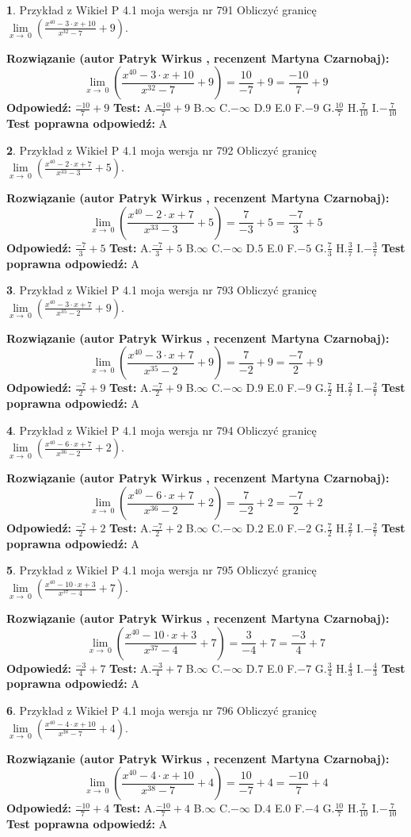 \documentclass[12pt, a4paper]{article}
\theoremstyle{definition} %
\newtheorem{zad}{}
\newcommand{\zadStart}[1]{\begin{zad}#1\newline}
\newcommand{\zadStop}{\end{zad}}
\newcommand{\rozwStart}[2]{\noindent \textbf{Rozwiązanie (autor #1 , recenzent #2): }\newline}
\newcommand{\rozwStop}{\newline}
\newcommand{\odpStart}{\noindent \textbf{Odpowiedź:}\newline}
\newcommand{\odpStop}{\newline}
\newcommand{\testStart}{\noindent \textbf{Test:}\newline}
\newcommand{\testStop}{\newline}
\newcommand{\kluczStart}{\noindent \textbf{Test poprawna odpowiedź:}\newline}
\newcommand{\kluczStop}{\newline}
\begin{document}
\zadStart{Przykład z Wikieł P 4.1 moja wersja nr 791}
Obliczyć granicę $\lim\limits_{x\to\ 0}(\frac{x^{40}-3 \cdot x +10}{x^{32}-7}+9)$.
\zadStop
\rozwStart{Patryk Wirkus}{Martyna Czarnobaj}
$$\lim\limits_{x\to\ 0}(\frac{x^{40}-3 \cdot x +10}{x^{32}-7}+9)=\frac{10}{-7}+9=\frac{-10}{7}+9$$
\rozwStop
\odpStart
$\frac{-10}{7}+9$
\odpStop
\testStart
A.$\frac{-10}{7}+9$
B.$\infty$
C.$-\infty$
D.$9$
E.$0$
F.$-9$
G.$\frac{10}{7}$
H.$\frac{7}{10}$
I.$-\frac{7}{10}$
\testStop
\kluczStart
A
\kluczStop



\zadStart{Przykład z Wikieł P 4.1 moja wersja nr 792}
Obliczyć granicę $\lim\limits_{x\to\ 0}(\frac{x^{40}-2 \cdot x +7}{x^{33}-3}+5)$.
\zadStop
\rozwStart{Patryk Wirkus}{Martyna Czarnobaj}
$$\lim\limits_{x\to\ 0}(\frac{x^{40}-2 \cdot x +7}{x^{33}-3}+5)=\frac{7}{-3}+5=\frac{-7}{3}+5$$
\rozwStop
\odpStart
$\frac{-7}{3}+5$
\odpStop
\testStart
A.$\frac{-7}{3}+5$
B.$\infty$
C.$-\infty$
D.$5$
E.$0$
F.$-5$
G.$\frac{7}{3}$
H.$\frac{3}{7}$
I.$-\frac{3}{7}$
\testStop
\kluczStart
A
\kluczStop



\zadStart{Przykład z Wikieł P 4.1 moja wersja nr 793}
Obliczyć granicę $\lim\limits_{x\to\ 0}(\frac{x^{40}-3 \cdot x +7}{x^{35}-2}+9)$.
\zadStop
\rozwStart{Patryk Wirkus}{Martyna Czarnobaj}
$$\lim\limits_{x\to\ 0}(\frac{x^{40}-3 \cdot x +7}{x^{35}-2}+9)=\frac{7}{-2}+9=\frac{-7}{2}+9$$
\rozwStop
\odpStart
$\frac{-7}{2}+9$
\odpStop
\testStart
A.$\frac{-7}{2}+9$
B.$\infty$
C.$-\infty$
D.$9$
E.$0$
F.$-9$
G.$\frac{7}{2}$
H.$\frac{2}{7}$
I.$-\frac{2}{7}$
\testStop
\kluczStart
A
\kluczStop



\zadStart{Przykład z Wikieł P 4.1 moja wersja nr 794}
Obliczyć granicę $\lim\limits_{x\to\ 0}(\frac{x^{40}-6 \cdot x +7}{x^{36}-2}+2)$.
\zadStop
\rozwStart{Patryk Wirkus}{Martyna Czarnobaj}
$$\lim\limits_{x\to\ 0}(\frac{x^{40}-6 \cdot x +7}{x^{36}-2}+2)=\frac{7}{-2}+2=\frac{-7}{2}+2$$
\rozwStop
\odpStart
$\frac{-7}{2}+2$
\odpStop
\testStart
A.$\frac{-7}{2}+2$
B.$\infty$
C.$-\infty$
D.$2$
E.$0$
F.$-2$
G.$\frac{7}{2}$
H.$\frac{2}{7}$
I.$-\frac{2}{7}$
\testStop
\kluczStart
A
\kluczStop



\zadStart{Przykład z Wikieł P 4.1 moja wersja nr 795}
Obliczyć granicę $\lim\limits_{x\to\ 0}(\frac{x^{40}-10 \cdot x +3}{x^{37}-4}+7)$.
\zadStop
\rozwStart{Patryk Wirkus}{Martyna Czarnobaj}
$$\lim\limits_{x\to\ 0}(\frac{x^{40}-10 \cdot x +3}{x^{37}-4}+7)=\frac{3}{-4}+7=\frac{-3}{4}+7$$
\rozwStop
\odpStart
$\frac{-3}{4}+7$
\odpStop
\testStart
A.$\frac{-3}{4}+7$
B.$\infty$
C.$-\infty$
D.$7$
E.$0$
F.$-7$
G.$\frac{3}{4}$
H.$\frac{4}{3}$
I.$-\frac{4}{3}$
\testStop
\kluczStart
A
\kluczStop



\zadStart{Przykład z Wikieł P 4.1 moja wersja nr 796}
Obliczyć granicę $\lim\limits_{x\to\ 0}(\frac{x^{40}-4 \cdot x +10}{x^{38}-7}+4)$.
\zadStop
\rozwStart{Patryk Wirkus}{Martyna Czarnobaj}
$$\lim\limits_{x\to\ 0}(\frac{x^{40}-4 \cdot x +10}{x^{38}-7}+4)=\frac{10}{-7}+4=\frac{-10}{7}+4$$
\rozwStop
\odpStart
$\frac{-10}{7}+4$
\odpStop
\testStart
A.$\frac{-10}{7}+4$
B.$\infty$
C.$-\infty$
D.$4$
E.$0$
F.$-4$
G.$\frac{10}{7}$
H.$\frac{7}{10}$
I.$-\frac{7}{10}$
\testStop
\kluczStart
A
\kluczStop
\end{document}
